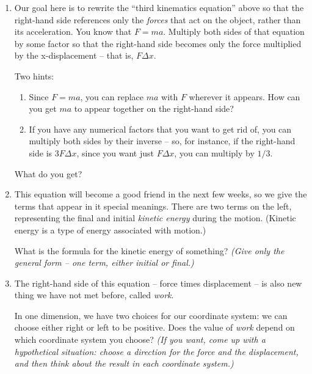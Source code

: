 \documentclass[12pt]{article}
\begin{document}
\begin{enumerate}
	\item Our goal here is to rewrite the ``third kinematics equation'' above so that the right-hand side references only the {\it forces} that act on the object, rather than its acceleration. You know that $F=ma$. Multiply both sides of that equation by some factor so that the right-hand side becomes only the force multiplied by the x-displacement -- that is, $F \Delta x$.
	
	Two hints:
	
	\begin{enumerate}
		\item Since $F=ma$, you can replace $ma$ with $F$ wherever it appears. How can you get $ma$ to appear together on the right-hand side?
		\item If you have any numerical factors that you want to get rid of, you can multiply both sides by their inverse -- so, for instance, if the right-hand side is $3 F \Delta x$, since you want just $F \Delta x$, you can multiply by $1/3$.
	\end{enumerate}
	
	
	 What do you get? 
	
	
	\vspace{2in}
	
	\item This equation will become a good friend in the next few weeks, so we give the terms that appear in it special meanings. There are two terms on the left, representing the final and initial {\it kinetic energy} during the motion. (Kinetic energy is a type of energy associated with motion.)
	
	What is the formula for the kinetic energy of something? {\it (Give only the general form -- one term, either initial or final.)}
	
	\vspace{1in}
	
	\item The right-hand side of this equation -- force times displacement -- is also new thing we have not met before, called {\it work}. 
	
	In one dimension, we have two choices for our coordinate system: we can choose either right or left to be positive. Does the value of {\it work} depend on which coordinate system you choose? {\it (If you want, come up with a hypothetical situation: choose a direction for the force and the displacement, and then think about the result in each coordinate system.)}
	

\end{enumerate}
\end{document}
